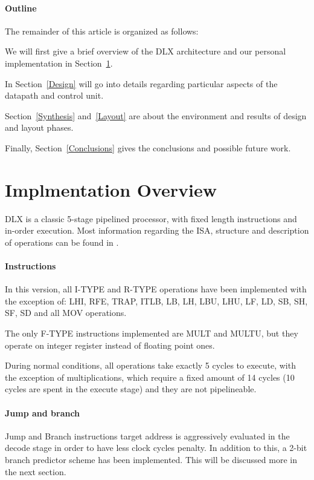 \documentclass[12pt]{article}
\begin{document}
\paragraph{Outline}
The remainder of this article is organized as follows:
 
We will first give a brief overview of the DLX architecture and our personal implementation in Section~\ref{Overview}.

In Section~\ref{Design} will go into details regarding particular aspects of the datapath and control unit.

Section~\ref{Synthesis} and~\ref{Layout} are about the environment and results of design and layout phases.

Finally, Section~\ref{Conclusions} gives the conclusions and possible future work.


\section{Implmentation Overview}\label{Overview}
DLX is a classic 5-stage pipelined processor, with fixed length instructions and in-order execution.
Most information regarding the ISA, structure and description of operations can be found in \cite{ISA}.
\paragraph{Instructions}
In this version, all I-TYPE and R-TYPE operations have been implemented with the exception of: LHI, RFE, TRAP, ITLB, LB, LH, LBU, LHU, LF, LD, SB, SH, SF, SD and all MOV operations.

The only F-TYPE instructions implemented are MULT and MULTU, but they operate on integer register instead of floating point ones.

During normal conditions, all operations take exactly 5 cycles to execute, with the exception of multiplications, which require a fixed amount of 14 cycles (10 cycles are spent in the execute stage) and they are not pipelineable.

\paragraph{Jump and branch}
Jump and Branch instructions target address is aggressively evaluated in the decode stage in order to have less clock cycles penalty.
In addition to this, a 2-bit branch predictor scheme has been implemented. This will be discussed more in the next section.
\end{document}
